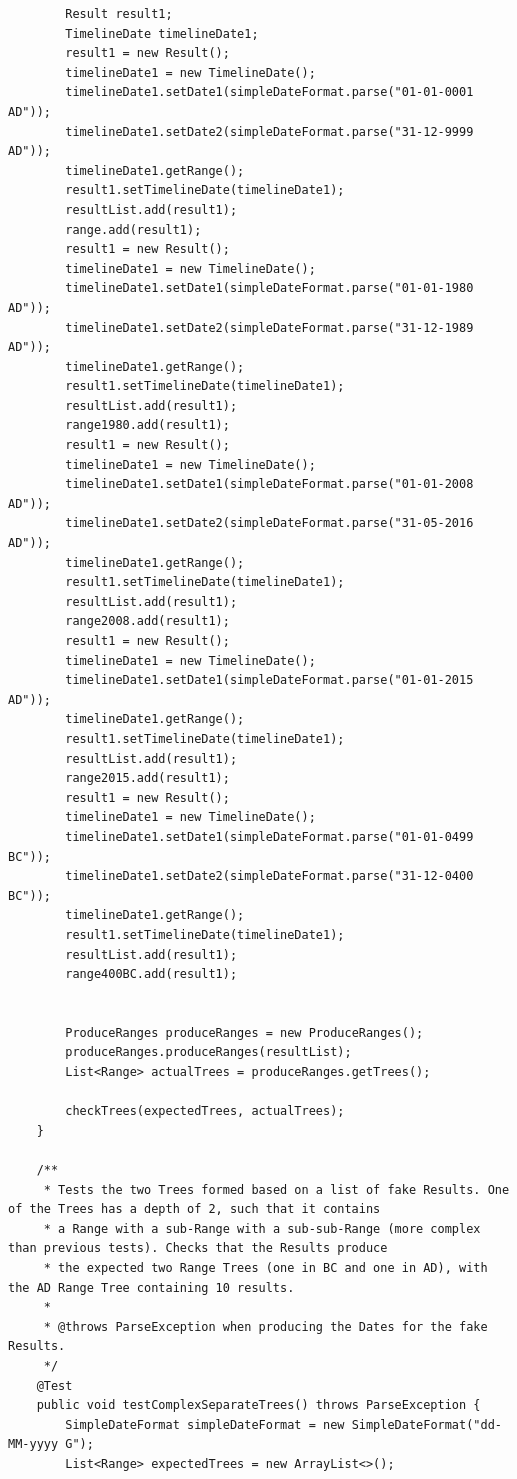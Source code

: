 \begin{lstlisting}
        Result result1;
        TimelineDate timelineDate1;
        result1 = new Result();
        timelineDate1 = new TimelineDate();
        timelineDate1.setDate1(simpleDateFormat.parse("01-01-0001 AD"));
        timelineDate1.setDate2(simpleDateFormat.parse("31-12-9999 AD"));
        timelineDate1.getRange();
        result1.setTimelineDate(timelineDate1);
        resultList.add(result1);
        range.add(result1);
        result1 = new Result();
        timelineDate1 = new TimelineDate();
        timelineDate1.setDate1(simpleDateFormat.parse("01-01-1980 AD"));
        timelineDate1.setDate2(simpleDateFormat.parse("31-12-1989 AD"));
        timelineDate1.getRange();
        result1.setTimelineDate(timelineDate1);
        resultList.add(result1);
        range1980.add(result1);
        result1 = new Result();
        timelineDate1 = new TimelineDate();
        timelineDate1.setDate1(simpleDateFormat.parse("01-01-2008 AD"));
        timelineDate1.setDate2(simpleDateFormat.parse("31-05-2016 AD"));
        timelineDate1.getRange();
        result1.setTimelineDate(timelineDate1);
        resultList.add(result1);
        range2008.add(result1);
        result1 = new Result();
        timelineDate1 = new TimelineDate();
        timelineDate1.setDate1(simpleDateFormat.parse("01-01-2015 AD"));
        timelineDate1.getRange();
        result1.setTimelineDate(timelineDate1);
        resultList.add(result1);
        range2015.add(result1);
        result1 = new Result();
        timelineDate1 = new TimelineDate();
        timelineDate1.setDate1(simpleDateFormat.parse("01-01-0499 BC"));
        timelineDate1.setDate2(simpleDateFormat.parse("31-12-0400 BC"));
        timelineDate1.getRange();
        result1.setTimelineDate(timelineDate1);
        resultList.add(result1);
        range400BC.add(result1);


        ProduceRanges produceRanges = new ProduceRanges();
        produceRanges.produceRanges(resultList);
        List<Range> actualTrees = produceRanges.getTrees();

        checkTrees(expectedTrees, actualTrees);
    }

    /**
     * Tests the two Trees formed based on a list of fake Results. One of the Trees has a depth of 2, such that it contains
     * a Range with a sub-Range with a sub-sub-Range (more complex than previous tests). Checks that the Results produce
     * the expected two Range Trees (one in BC and one in AD), with the AD Range Tree containing 10 results.
     *
     * @throws ParseException when producing the Dates for the fake Results.
     */
    @Test
    public void testComplexSeparateTrees() throws ParseException {
        SimpleDateFormat simpleDateFormat = new SimpleDateFormat("dd-MM-yyyy G");
        List<Range> expectedTrees = new ArrayList<>();


\end{lstlisting}
